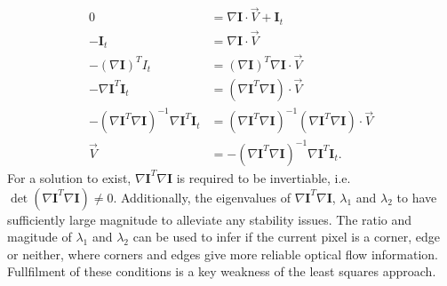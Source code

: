 \begin{align*}
    0 &= \nabla \mathbf{I} \cdot \vec{V} + \mathbf{I}_t \\
    - \mathbf{I}_t &= \nabla \mathbf{I} \cdot \vec{V} \\
    - (\nabla \mathbf{I})^T I_t &= (\nabla \mathbf{I})^{T} \nabla \mathbf{I} \cdot \vec{V} \\
    - \nabla \mathbf{I}^T \mathbf{I}_t &= (\nabla \mathbf{I}^{T} \nabla \mathbf{I}) \cdot \vec{V} \\
    - (\nabla \mathbf{I}^{T} \nabla \mathbf{I})^{-1} \nabla \mathbf{I}^T \mathbf{I}_t &= (\nabla \mathbf{I}^{T} \nabla \mathbf{I})^{-1}(\nabla \mathbf{I}^{T} \nabla \mathbf{I}) \cdot \vec{V} \\
    \vec{V} &= -(\nabla \mathbf{I}^{T} \nabla \mathbf{I})^{-1} \nabla \mathbf{I}^T \mathbf{I}_t.
\end{align*}
For a solution to exist, $\nabla \mathbf{I}^{T} \nabla \mathbf{I}$ is required to be invertiable, i.e. $\det(\nabla \mathbf{I}^{T} \nabla \mathbf{I}) \ne 0$. Additionally, the eigenvalues of $\nabla \mathbf{I}^{T} \nabla \mathbf{I}$, $\lambda_1$ and $\lambda_2$ to have sufficiently large magnitude to alleviate any stability issues. The ratio and magitude of $\lambda_1$ and $\lambda_2$ can be used to infer if the current pixel is a corner, edge or neither, where corners and edges give more reliable optical flow information. Fullfilment of these conditions is a key weakness of the least squares approach.




